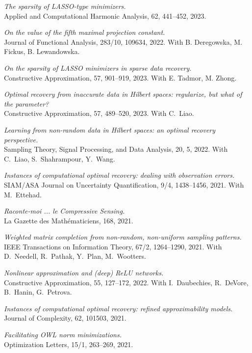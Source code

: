 \documentclass[11pt]{article}
\begin{document}
\item {\sl The sparsity of LASSO-type minimizers.}\\
Applied and Computational Harmonic Analysis, 62, 441--452, 2023.
\item {\sl On the value of the fifth maximal projection constant.}\\
Journal of Functional Analysis, 283/10, 109634, 2022.
With B. Deregowska, M. Fickus,  B. Lewandowska.
\item {\sl On the sparsity of LASSO minimizers in sparse data recovery.}\\
Constructive Approximation, 57, 901--919, 2023. With E. Tadmor, M.  Zhong.
\item {\sl Optimal recovery from inaccurate data in Hilbert spaces: regularize, but what of the parameter?}\\
Constructive Approximation, 57, 489--520, 2023.  With C.~Liao.
\item {\sl Learning from non-random data in Hilbert spaces: an optimal recovery perspective.}\\
Sampling Theory, Signal Processing, and Data Analysis,
20, 5, 2022.
With C.~Liao, S.~Shahrampour, Y.~Wang. 
\item {\sl Instances of computational optimal recovery: dealing with observation errors.}\\
SIAM/ASA Journal on Uncertainty Quantification, 9/4, 1438--1456, 2021. 
With M.~Ettehad.
\item {\sl Raconte-moi ... le Compressive Sensing.}\\
La Gazette des Math\'ematiciens, 168, 2021. 
\item {\sl Weighted matrix completion from non-random, non-uniform sampling patterns.}\\
IEEE Transactions on Information Theory, 67/2, 1264--1290, 2021.
With D.~Needell, R.~Pathak, Y.~Plan, \mbox{M.~Wootters}.
\item {\sl Nonlinear approximation and (deep) ReLU networks.}\\
Constructive Approximation,  55, 127--172, 2022.
With I.~Daubechies, R.~DeVore, B.~Hanin, G.~Petrova.
\item {\sl Instances of computational optimal recovery: refined approximability models.}\\
Journal of Complexity, 62, 101503, 2021.
\item {\sl Facilitating OWL norm minimizations.}\\
Optimization Letters, 15/1, 263--269, 2021.
\end{document}
